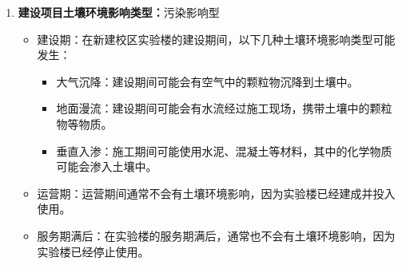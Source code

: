 \begin{enumerate}
    \item \textbf{建设项目土壤环境影响类型：}污染影响型
    \begin{itemize}
        \item 建设期：在新建校区实验楼的建设期间，以下几种土壤环境影响类型可能发生：
        \begin{itemize}
            \item 大气沉降：建设期间可能会有空气中的颗粒物沉降到土壤中。
            \item 地面漫流：建设期间可能会有水流经过施工现场，携带土壤中的颗粒物等物质。
            \item 垂直入渗：施工期间可能使用水泥、混凝土等材料，其中的化学物质可能会渗入土壤中。
        \end{itemize}
        \item 运营期：运营期间通常不会有土壤环境影响，因为实验楼已经建成并投入使用。
        \item 服务期满后：在实验楼的服务期满后，通常也不会有土壤环境影响，因为实验楼已经停止使用。
    \end{itemize}
    \begin{table}[H]
        \centering
        \caption{建设项目土壤环境影响类型与影响途径表\cite{HJ964-2018}}
        \label{tab:Soil environmental impact types and impact pathways of construction projects}
    \end{table}


\end{enumerate}
